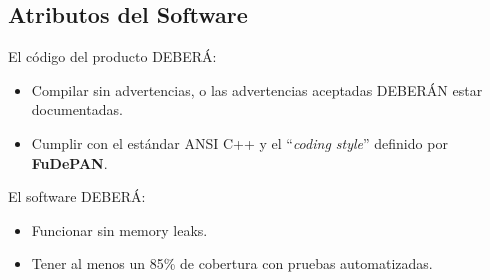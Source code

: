 \documentclass[12pt,a4paper,spanish]{article}
\begin{document}
\subsection{Atributos del Software}
\par El código del producto DEBERÁ:
\begin{itemize}
 \item Compilar sin advertencias, o las advertencias aceptadas DEBERÁN estar documentadas.
 \item Cumplir con el estándar ANSI C++ y el ``\textit{coding style}'' definido por \textbf{FuDePAN}.
\end{itemize}
\par El software DEBERÁ:
\begin{itemize}
	\item Funcionar sin memory leaks.
	\item Tener al menos un 85\% de cobertura con pruebas automatizadas.
\end{itemize}

\pagebreak

\begin{appendices} 
  
  
       
\end{appendices}
\end{document}
